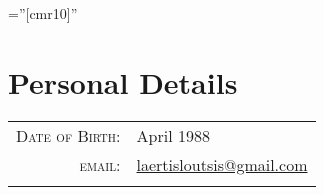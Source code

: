 \documentclass[a4paper,10pt]{article} %
\begin{document}
\pagestyle{empty} %

\font\fb=''[cmr10]'' %


\par{\bigskip\par} %

\section{Personal Details}

\begin{tabular}{rl}
\textsc{Date of Birth:} & April 1988 \\
\textsc{email:} & \href{mailto:laertisloutsis@gmail.com}{laertisloutsis@gmail.com} \\
\\
\end{tabular}

\end{document}
